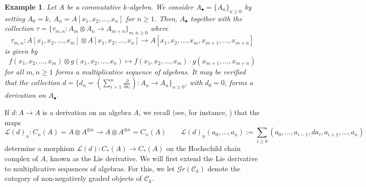 \documentclass[10pt, colorlinks]{article}
\numberwithin{equation}{section} \DeclareMathSizes{2}{10}{12}{13}
\newtheorem{eg}[thm]{Example}
\begin{document}
\begin{eg}
 \emph{Let $A$ be a commutative $k$-algebra. We consider ${A}_\bullet=\{A_n\}_{n\geq 0}$ by setting $A_0=k$, $A_n=A[x_1,x_2,\ldots,x_n]$ for $n\geq 1$. Then, ${A}_\bullet$ together with the collection $\tau=\{\tau_{m,n}:A_m\otimes A_n\longrightarrow A_{m+n}\}_{m,n\geq 0}$
   where} \begin{equation*}
       \tau_{m,n}:A[x_1,x_2,\ldots,x_m]\otimes A[x_1,x_2,\ldots,x_n]\longrightarrow A[x_1,x_2,\ldots,x_m,x_{m+1},\ldots,x_{m+n}]
   \end{equation*}
\emph{is given by} \begin{equation*}
       f(x_1,x_2,\ldots,x_m)\otimes g(x_1,x_2,\ldots,x_n)\longmapsto f(x_1,x_2,\ldots,x_m)\cdot g(x_{m+1},\ldots,x_{m+n})
   \end{equation*}
\emph{for all $m,n\geq 1$  forms a multiplicative sequence of algebras.
   It may be verified that the collection $d=\big\{d_n=(\sum_{i=1}^n\frac{ \partial}{\partial x_i}):A_n\longrightarrow A_n\big\}_{n\geq 0}$, with $d_0=0$, forms a derivation on ${A}_\bullet$.}

\end{eg}
    
    If $d:A\longrightarrow A$ is a derivation on an algebra $A$, we recall (see, for instance, \cite[\S 4.1.4]{DAV}) that the maps
    \begin{equation}\label{eq2.11}
       \mathscr{L}(d)_n:C_n(A)=A\otimes A^{\otimes n} \longrightarrow A\otimes A^{\otimes n} =C_n(A)\qquad  \mathscr{L}(d)_{n}(a_0,\ldots,a_n):=\sum_{i\geq 0}(a_0,\ldots,a_{i-1},da_i,a_{i+1},\ldots,a_n)
    \end{equation}
  determine a morphism $\mathscr{L}(d): C_*(A)\longrightarrow C_*(A)$ on the Hochschild chain complex of $A$, known as the Lie derivative. We will first extend the Lie derivative to multiplicative sequences of algebras. For this, we let $\mathscr Gr (\mathcal C_k)$ denote the category of non-negatively graded objects of $\mathcal C_k$. 
  
\end{document}
